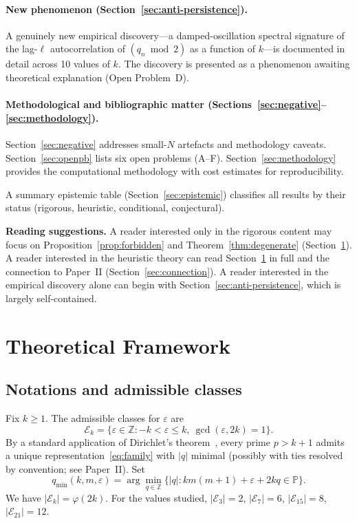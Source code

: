\documentclass[11pt,a4paper]{article}
\theoremstyle{plain}
\theoremstyle{definition}
\newcommand{\qmin}{q_{\min}}
\newcommand{\Z}{\mathbb{Z}}
\newcommand{\Prim}{\mathbb{P}}
\newcommand{\eps}{\varepsilon}
\newcommand{\Eclass}{\mathcal{E}}
\begin{document}
\paragraph{New phenomenon (Section~\ref{sec:anti-persistence}).}
A genuinely new empirical discovery---a damped-oscillation spectral signature
of the lag-$\ell$ autocorrelation of $(q_n \bmod 2)$ as a function of $k$---is
documented in detail across 10 values of $k$. The discovery is presented as a
phenomenon awaiting theoretical explanation (Open Problem~D).

\paragraph{Methodological and bibliographic matter
(Sections~\ref{sec:negative}--\ref{sec:methodology}).}
Section~\ref{sec:negative} addresses small-$N$ artefacts and methodology
caveats. Section~\ref{sec:openpb} lists six open problems
(\textsf{A}--\textsf{F}). Section~\ref{sec:methodology} provides the
computational methodology with cost estimates for reproducibility.

A summary epistemic table (Section~\ref{sec:epistemic}) classifies all results
by their status (rigorous, heuristic, conditional, conjectural).

\smallskip
\noindent\textbf{Reading suggestions.} A reader interested only in the rigorous
content may focus on Proposition~\ref{prop:forbidden} and
Theorem~\ref{thm:degenerate} (Section~\ref{sec:framework}). A reader interested
in the heuristic theory can read Section~\ref{sec:framework} in full and the
connection to Paper~II (Section~\ref{sec:connection}). A reader interested in
the empirical discovery alone can begin with
Section~\ref{sec:anti-persistence}, which is largely self-contained.

\section{Theoretical Framework}
\label{sec:framework}

\subsection{Notations and admissible classes}

Fix $k \ge 1$. The admissible classes for $\eps$ are
\[
\Eclass_k = \{\eps \in \Z : -k < \eps \le k,\ \gcd(\eps, 2k) = 1\}.
\]
By a standard application of Dirichlet's theorem~\cite{dirichlet}, every prime
$p > k+1$ admits a unique representation~\eqref{eq:family} with $|q|$ minimal
(possibly with ties resolved by convention; see Paper~II). Set
\[
\qmin(k, m, \eps) = \arg\min_{q \in \Z}\{|q| : km(m+1) + \eps + 2kq \in \Prim\}.
\]
We have $|\Eclass_k| = \varphi(2k)$. For the values studied,
$|\Eclass_3| = 2$, $|\Eclass_7| = 6$, $|\Eclass_{15}| = 8$, $|\Eclass_{21}| = 12$.
\end{document}

